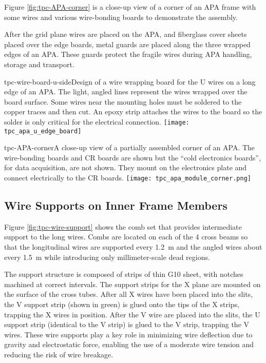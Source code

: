 Figure \ref{fig:tpc-APA-corner} is a close-up view of a corner of an APA frame with some wires and various wire-bonding boards to demonstrate the assembly.

After the grid plane wires are placed on the APA, and fiberglass cover sheets placed over the edge boards, metal guards are placed along the three wrapped edges of an APA. These guards protect the fragile wires during APA handling, storage and transport.



\begin{cdrfigure}{tpc-wire-board-u-side}{Design of a wire wrapping board for the U wires on a long edge of an APA. The light, angled lines represent the wires wrapped over the board surface. Some wires near the mounting holes must be soldered to the copper traces and then cut.  An epoxy strip attaches the wires to the board so the solder is only critical for the electrical connection.}
\texttt{[image: tpc\_apa\_u\_edge\_board]}
\end{cdrfigure}


\begin{cdrfigure}{tpc-APA-corner}{A close-up view of a partially assembled corner of an APA.  The wire-bonding boards and CR boards are shown but the ``cold electronics boards'', for data acquisition, are not shown.  They mount on the electronics plate and connect electrically to the CR boards.}
\texttt{[image: tpc\_apa\_module\_corner.png]}
\end{cdrfigure}


\subsection{Wire Supports on Inner Frame Members}

Figure \ref{fig:tpc-wire-support} shows the comb set that provides intermediate support to the long wires.  Combs are located on each of the 4 cross beams so that the longitudinal wires are supported every 1.2~m and the angled wires about every 1.5~m while introducing only millimeter-scale dead regions.

The support structure is composed of strips of thin G10 sheet, with notches machined at correct intervals. The support strips for the X plane are mounted on the surface of the cross tubes.  After all X wires have been placed into the slits, the V support strip (shown in green) is glued onto the tips of the X strips, trapping the X wires in position.  After the V wire are placed into the slits, the U support strip (identical to the V strip) is glued to the V strip, trapping the V wires.  These wire supports play a key role in minimizing wire deflection due to gravity and electrostatic force, enabling the use of a moderate wire tension and reducing the risk of wire breakage.



